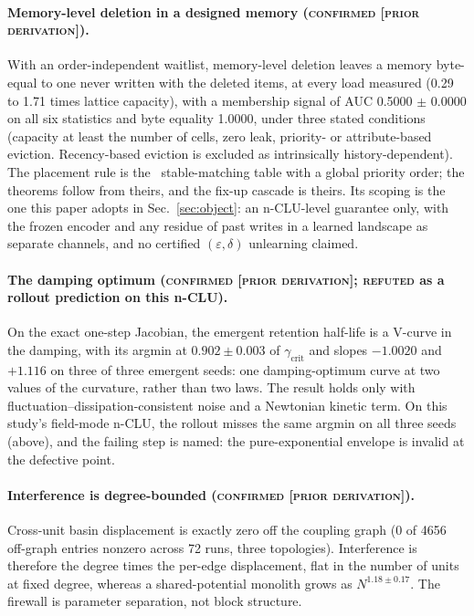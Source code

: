 \documentclass{article} %
\begin{document}
\paragraph{Memory-level deletion in a designed memory (\textsc{confirmed [prior
derivation]}).} With an order-independent waitlist, memory-level deletion leaves a memory
byte-equal to one never written with the deleted items, at every load measured (0.29 to 1.71 times lattice capacity), with a membership signal of AUC 0.5000 $\pm$ 0.0000 on all
six statistics and byte equality 1.0000, under three stated conditions (capacity at least the number
of cells, zero leak, priority- or attribute-based eviction. Recency-based eviction is excluded as
intrinsically history-dependent). %
The placement rule is the~\citet{blelloch_strongly_2007} stable-matching table with a global priority order;
the theorems follow from theirs, and the fix-up cascade is theirs. Its scoping is the one this
paper adopts in Sec.~\ref{sec:object}: an n-CLU-level guarantee only, with the frozen encoder and any
residue of past writes in a learned landscape as separate channels, and no certified
$(\varepsilon,\delta)$ unlearning claimed. %

\paragraph{The damping optimum (\textsc{confirmed [prior derivation]}; \textsc{refuted} as a
rollout prediction on this n-CLU).} On the exact one-step Jacobian, the emergent retention
half-life is a V-curve in the damping, with its argmin at $0.902\pm0.003$ of
$\gamma_{\text{crit}}$ and slopes $-1.0020$ and $+1.116$ on three of three emergent seeds: one
damping-optimum curve at two values of the curvature, rather than two laws.
The result holds only with fluctuation--dissipation-consistent noise and a Newtonian kinetic term.
On this study's field-mode n-CLU, the rollout misses the same argmin on all three seeds (above), and the
failing step is named: the pure-exponential envelope is invalid at the defective point.

\paragraph{Interference is degree-bounded (\textsc{confirmed [prior derivation]}).} Cross-unit
basin displacement is exactly zero off the coupling graph (0 of 4656 off-graph entries nonzero
across 72 runs, three topologies). Interference is therefore the degree times the per-edge
displacement, flat in the number of units at fixed degree, whereas a shared-potential monolith
grows as $N^{1.18\pm0.17}$. The firewall is parameter separation, not block structure.
\end{document}
